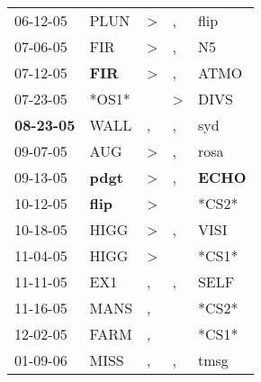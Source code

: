 \begin{supertabular}{p{0.07\textwidth}p{0.06\textwidth}p{0.02\textwidth}p{0.02\textwidth}p{0.06\textwidth}}
          06-12-05\textsuperscript{} &           PLUN\textsuperscript{} &     \textgreater &                , &           flip\textsuperscript{} \\
          07-06-05\textsuperscript{} &            FIR\textsuperscript{} &     \textgreater &                , &             N5\textsuperscript{} \\
          07-12-05\textsuperscript{} &   \textbf{FIR\textsuperscript{}} &     \textgreater &                , &           ATMO\textsuperscript{} \\
          07-23-05\textsuperscript{} &                            *OS1* &                  &     \textgreater &           DIVS\textsuperscript{} \\
 \textbf{08-23-05\textsuperscript{}} &           WALL\textsuperscript{} &                , &                , &            syd\textsuperscript{} \\
          09-07-05\textsuperscript{} &            AUG\textsuperscript{} &     \textgreater &                , &           rosa\textsuperscript{} \\
          09-13-05\textsuperscript{} &  \textbf{pdgt\textsuperscript{}} &     \textgreater &                , &  \textbf{ECHO\textsuperscript{}} \\
          10-12-05\textsuperscript{} &  \textbf{flip\textsuperscript{}} &     \textgreater &                  &                            *CS2* \\
          10-18-05\textsuperscript{} &           HIGG\textsuperscript{} &     \textgreater &                , &           VISI\textsuperscript{} \\
          11-04-05\textsuperscript{} &           HIGG\textsuperscript{} &     \textgreater &                  &                            *CS1* \\
          11-11-05\textsuperscript{} &            EX1\textsuperscript{} &                , &                , &           SELF\textsuperscript{} \\
          11-16-05\textsuperscript{} &           MANS\textsuperscript{} &                , &                  &                            *CS2* \\
          12-02-05\textsuperscript{} &           FARM\textsuperscript{} &                , &                  &                            *CS1* \\
          01-09-06\textsuperscript{} &           MISS\textsuperscript{} &                , &                , &           tmsg\textsuperscript{} \\

\end{supertabular}
